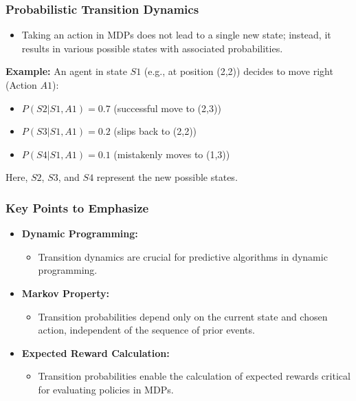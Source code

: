 \documentclass[aspectratio=169]{beamer}
\begin{document}
\begin{frame}[fragile]
    \frametitle{Probabilistic Transition Dynamics}
    \begin{itemize}
        \item Taking an action in MDPs does not lead to a single new state; instead, it results in various possible states with associated probabilities.
    \end{itemize}
    
    \textbf{Example:} An agent in state $S1$ (e.g., at position (2,2)) decides to move right (Action $A1$):
    \begin{itemize}
        \item $P(S2 | S1, A1) = 0.7$ (successful move to (2,3))
        \item $P(S3 | S1, A1) = 0.2$ (slips back to (2,2))
        \item $P(S4 | S1, A1) = 0.1$ (mistakenly moves to (1,3))
    \end{itemize}
    Here, $S2$, $S3$, and $S4$ represent the new possible states.
\end{frame}

\begin{frame}[fragile]
    \frametitle{Key Points to Emphasize}
    \begin{itemize}
        \item \textbf{Dynamic Programming:}
            \begin{itemize}
                \item Transition dynamics are crucial for predictive algorithms in dynamic programming.
            \end{itemize}
        \item \textbf{Markov Property:}
            \begin{itemize}
                \item Transition probabilities depend only on the current state and chosen action, independent of the sequence of prior events.
            \end{itemize}
        \item \textbf{Expected Reward Calculation:}
            \begin{itemize}
                \item Transition probabilities enable the calculation of expected rewards critical for evaluating policies in MDPs.
            \end{itemize}
    \end{itemize}
\end{frame}
\end{document}
